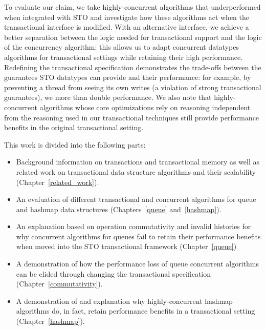 To evaluate our claim, we take highly-concurrent algorithms that underperformed when integrated with STO and investigate how these algorithms act when the transactional interface is modified. 
With an alternative interface, we achieve a better separation between the logic needed for transactional support and the logic of the concurrency algorithm: this allows us to adapt concurrent datatypes algorithms for transactional settings while retaining their high performance.
Redefining the transactional specification demonstrates the trade-offs between the guarantees STO datatypes can provide and their performance: for example, by preventing a thread from seeing its own writes (a violation of strong transactional guarantees), we more than double performance.
We also note that highly-concurrent algorithms whose core optimizations rely on reasoning independent from the reasoning used in our transactional techniques still provide performance benefits in the original transactional setting.

This work is divided into the following parts: 
\begin{itemize}
    \item Background information on transactions and transactional memory as well as related work on transactional data structure algorithms and their scalability (Chapter~\ref{related_work}).
    \item An evaluation of different transactional and concurrent algorithms for queue and hashmap data structures (Chapters~\ref{queue} and~\ref{hashmap}).
    \item An explanation based on operation commutativity and invalid histories for why concurrent algorithms for queues fail to retain their performance benefits when moved into the STO transactional framework (Chapter~\ref{queue})
    \item A demonstration of how the performance loss of queue concurrent algorithms can be elided through changing the transactional specification (Chapter~\ref{commutativity}).
    \item A demonstration of and explanation why highly-concurrent hashmap algorithms do, in fact, retain performance benefits in a transactional setting (Chapter~\ref{hashmap}).
\end{itemize}
